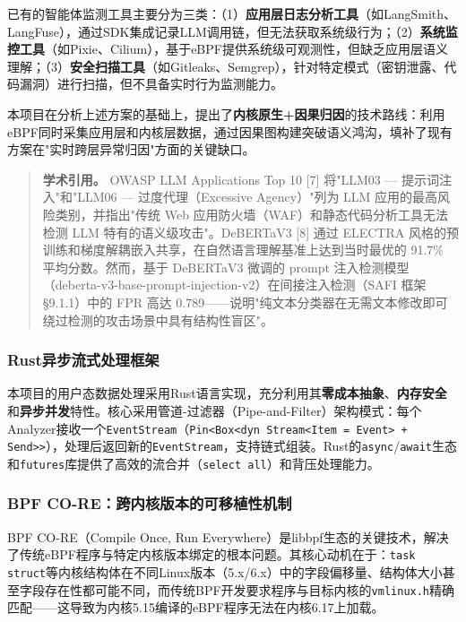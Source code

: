 \documentclass[a4paper]{ctexart}
\makeatletter
\renewcommand{\_}{%
  \ifmmode
    \nfss@text{\textunderscore}%
  \else
    \textunderscore\discretionary{}{}{}%
  \fi}
\makeatother
\begin{document}
已有的智能体监测工具主要分为三类：（1）\textbf{应用层日志分析工具}（如LangSmith、LangFuse），通过SDK集成记录LLM调用链，但无法获取系统级行为；（2）\textbf{系统监控工具}（如Pixie、Cilium），基于eBPF提供系统级可观测性，但缺乏应用层语义理解；（3）\textbf{安全扫描工具}（如Gitleaks、Semgrep），针对特定模式（密钥泄露、代码漏洞）进行扫描，但不具备实时行为监测能力。


本项目在分析上述方案的基础上，提出了\textbf{内核原生+因果归因}的技术路线：利用eBPF同时采集应用层和内核层数据，通过因果图构建突破语义鸿沟，填补了现有方案在"实时跨层异常归因"方面的关键缺口。


\begin{quote}
\textbf{学术引用。} OWASP LLM Applications Top 10 [7] 将"LLM03 — 提示词注入"和"LLM06 — 过度代理（Excessive Agency）"列为 LLM 应用的最高风险类别，并指出"传统 Web 应用防火墙（WAF）和静态代码分析工具无法检测 LLM 特有的语义级攻击"。DeBERTaV3 [8] 通过 ELECTRA 风格的预训练和梯度解耦嵌入共享，在自然语言理解基准上达到当时最优的 91.7\% 平均分数。然而，基于 DeBERTaV3 微调的 prompt 注入检测模型（deberta-v3-base-prompt-injection-v2）在间接注入检测（SAFI 框架 §9.1.1）中的 FPR 高达 0.789——说明"纯文本分类器在无需文本修改即可绕过检测的攻击场景中具有结构性盲区"。

\end{quote}


\subsubsection{Rust异步流式处理框架}



本项目的用户态数据处理采用Rust语言实现，充分利用其\textbf{零成本抽象}、\textbf{内存安全}和\textbf{异步并发}特性。核心采用管道-过滤器（Pipe-and-Filter）架构模式：每个Analyzer接收一个\texttt{EventStream}（\texttt{Pin<Box<dyn Stream<Item = Event> + Send>>}），处理后返回新的\texttt{EventStream}，支持链式组装。Rust的\texttt{async}/\texttt{await}生态和\texttt{futures}库提供了高效的流合并（\texttt{select\_all}）和背压处理能力。


\subsubsection{BPF CO-RE：跨内核版本的可移植性机制}



BPF CO-RE（Compile Once, Run Everywhere）是libbpf生态的关键技术，解决了传统eBPF程序与特定内核版本绑定的根本问题。其核心动机在于：\texttt{task\_struct}等内核结构体在不同Linux版本（5.x/6.x）中的字段偏移量、结构体大小甚至字段存在性都可能不同，而传统BPF开发要求程序与目标内核的\texttt{vmlinux.h}精确匹配——这导致为内核5.15编译的eBPF程序无法在内核6.17上加载。
\end{document}
